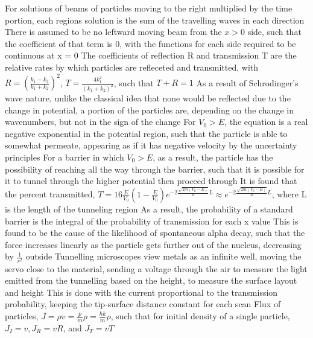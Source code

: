 \documentclass[11 pt, twoside]{article}
\newenvironment{outline*}
{
	\begin{outline}[enumerate]
	}
	{\end{outline}
}
\begin{document}
\begin{outline*}
		\3 For solutions of beams of particles moving to the right multiplied by the time portion, each regions solution is the sum of the travelling waves in each direction
		\3 There is assumed to be no leftward moving beam from the $x > 0$ side, such that the coefficient of that term is 0, with the functions for each side required to be continuous at x = 0
		\3 The coefficients of reflection R and transmission T are the relative rates by which particles are refleceted and transmitted, with $R = (\frac{k_1 - k_2}{k_1 + k_2})^2$, $T = \frac{4k_1^2}{(k_1 + k_2)^2}$, such that $T + R = 1$
	\2 As a result of Schrodinger's wave nature, unlike the classical idea that none would be reflected due to the change in potential, a portion of the particles are, depending on the change in wavenumbers, but not in the sign of the change
	\2 For $V_0 > E$, the equation is a real negative exponential in the potential region, such that the particle is able to somewhat permeate, appearing as if it has negative velocity by the uncertainty principles
	\2 For a barrier in which $V_0 > E$, as a result, the particle has the possibility of reaching all the way through the barrier, such that it is possible for it to tunnel through the higher potential then proceed through
		\3 It is found that the percent transmitted, $T = 16\frac{E}{V_0}(1 - \frac{E}{V_0})e^{-2\frac{\sqrt{2m(V_0 - E)}}{\hbar}L} \approx e^{-2\frac{\sqrt{2m(V_0 - E)}}{\hbar}L}$, where L is the length of the tunneling region
		\3 As a result, the probability of a standard barrier is the integral of the probability of transmission for each x value 
		\3 This is found to be the cause of the likelihood of spontaneous alpha decay, such that the force increases linearly as the particle gets further out of the nucleus, decreasing by $\frac{1}{r^2}$ outside
		\3 Tunnelling microscopes view metals as an infinite well, moving the servo close to the material, sending a voltage through the air to measure the light emitted from the tunnelling based on the height, to measure the surface layout and height
			\4 This is done with the current proportional to the transmission probability, keeping the tip-surface distance constant for each scan
	\2 Flux of particles, $J = \rho v = \frac{p}{m} \rho = \frac{\hbar k}{m} \rho$, such that for initial density of a single particle, $J_I = v, J_{R} = vR$, and $J_T = vT$
\end{outline*}
\end{document}
